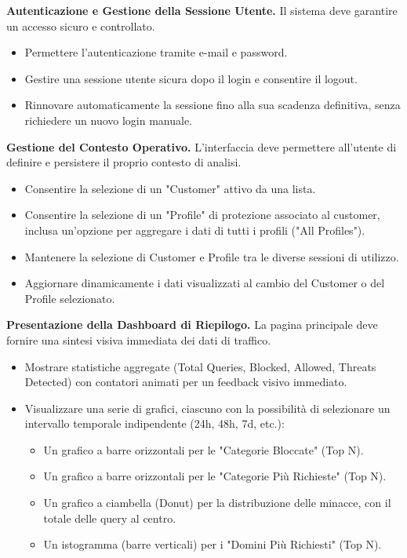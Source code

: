 \documentclass[12pt,a4paper,openright,twoside]{book}
\begin{document}
\begin{reqfunz}
    \item \label{req:auth} \textbf{Autenticazione e Gestione della Sessione Utente.} Il sistema deve garantire un accesso sicuro e controllato.
    \begin{itemize}
        \item Permettere l'autenticazione tramite e-mail e password.
        \item Gestire una sessione utente sicura dopo il login e consentire il logout.
        \item Rinnovare automaticamente la sessione fino alla sua scadenza definitiva, senza richiedere un nuovo login manuale.
    \end{itemize}

    \item \label{req:context} \textbf{Gestione del Contesto Operativo.} L'interfaccia deve permettere all'utente di definire e persistere il proprio contesto di analisi.
    \begin{itemize}
        \item Consentire la selezione di un "Customer" attivo da una lista.
        \item Consentire la selezione di un "Profile" di protezione associato al customer, inclusa un'opzione per aggregare i dati di tutti i profili ("All Profiles").
        \item Mantenere la selezione di Customer e Profile tra le diverse sessioni di utilizzo.
        \item Aggiornare dinamicamente i dati visualizzati al cambio del Customer o del Profile selezionato.
    \end{itemize}

    \item \label{req:dashboard} \textbf{Presentazione della Dashboard di Riepilogo.} La pagina principale deve fornire una sintesi visiva immediata dei dati di traffico.
    \begin{itemize}
        \item Mostrare statistiche aggregate (Total Queries, Blocked, Allowed, Threats Detected) con contatori animati per un feedback visivo immediato.
        \item Visualizzare una serie di grafici, ciascuno con la possibilità di selezionare un intervallo temporale indipendente (24h, 48h, 7d, etc.):
              \begin{itemize}
                  \item Un grafico a barre orizzontali per le "Categorie Bloccate" (Top N).
                  \item Un grafico a barre orizzontali per le "Categorie Più Richieste" (Top N).
                  \item Un grafico a ciambella (Donut) per la distribuzione delle minacce, con il totale delle query al centro.
                  \item Un istogramma (barre verticali) per i "Domini Più Richiesti" (Top N).
              \end{itemize}
    \end{itemize}


\end{reqfunz}
\end{document}
